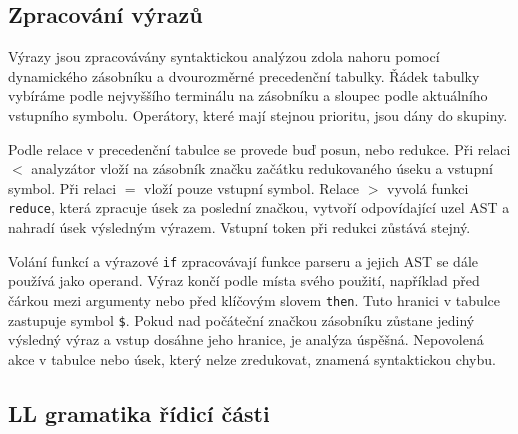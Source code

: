 \documentclass[11pt,a4paper]{article}
\begin{document}
\subsection{Zpracování výrazů}
Výrazy jsou zpracovávány syntaktickou analýzou zdola nahoru pomocí dynamického zásobníku a dvourozměrné precedenční tabulky. Řádek tabulky vybíráme podle nejvyššího terminálu na zásobníku a sloupec podle aktuálního vstupního symbolu. Operátory, které mají stejnou prioritu, jsou dány do skupiny.

Podle relace v precedenční tabulce se provede buď posun, nebo redukce. Při relaci $<$ analyzátor vloží na zásobník značku začátku redukovaného úseku a vstupní symbol. Při relaci $=$ vloží pouze vstupní symbol. Relace $>$ vyvolá funkci \texttt{reduce}, která zpracuje úsek za poslední značkou, vytvoří odpovídající uzel AST a nahradí úsek výsledným výrazem. Vstupní token při redukci zůstává stejný.

Volání funkcí a výrazové \texttt{if} zpracovávají funkce parseru a jejich AST se dále používá jako operand. Výraz končí podle místa svého použití, například před čárkou mezi argumenty nebo před klíčovým slovem \texttt{then}. Tuto hranici v tabulce zastupuje symbol \texttt{\$}. Pokud nad počáteční značkou zásobníku zůstane jediný výsledný výraz a vstup dosáhne jeho hranice, je analýza úspěšná. Nepovolená akce v tabulce nebo úsek, který nelze zredukovat, znamená syntaktickou chybu.


\subsection{LL gramatika řídicí části}
\end{document}
